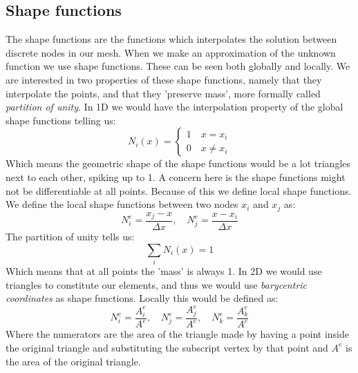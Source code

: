 \subsection{Shape functions}
The shape functions are the functions which interpolates the solution between discrete nodes in our mesh. When we make an approximation of the unknown function we use shape functions. These can be seen both globally and locally. We are interested in two properties of these shape functions, namely that they interpolate the points, and that they 'preserve mass', more formally called \textit{partition of unity}. In 1D we would have the interpolation property of the global shape functions telling us:
\begin{equation*}
	N_i(x) = \begin{cases}
		1 \quad x = x_i\\
		0 \quad x \neq x_i
	\end{cases}
\end{equation*}
Which means the geometric shape of the shape functions would be a lot triangles next to each other, spiking up to 1. A concern here is the shape functions might not be differentiable at all points. Because of this we define local shape functions. We define the local shape functions between two nodes $x_i$ and $x_j$ as:
\begin{equation*}
	N_i^e = \frac{x_j - x}{\Delta x}, \quad N_j^e = \frac{x - x_i}{\Delta x}
\end{equation*} 
The partition of unity tells us:
\begin{equation*}
	\sum_i N_i(x) = 1
\end{equation*}
Which means that at all points the 'mass' is always 1. In 2D we would use triangles to constitute our elements, and thus we would use \textit{barycentric coordinates} as shape functions. Locally this would be defined as:
\begin{equation*}
	N_i^e = \frac{A_i^e}{A^e}, \quad N_j^e = \frac{A_j^e}{A^e}, \quad N_k^e = \frac{A_k^e}{A^e}
\end{equation*}
Where the numerators are the area of the triangle made by having a point inside the original triangle and substituting the subscript vertex by that point and $A^e$ is the area of the original triangle.

